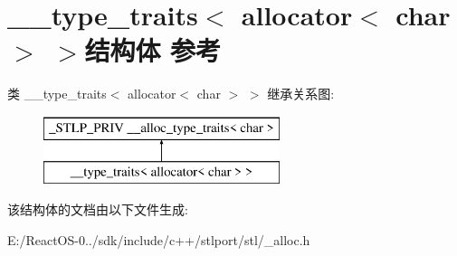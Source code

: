 \hypertarget{struct____type__traits_3_01allocator_3_01char_01_4_01_4}{}\section{\+\_\+\+\_\+type\+\_\+traits$<$ allocator$<$ char $>$ $>$结构体 参考}
\label{struct____type__traits_3_01allocator_3_01char_01_4_01_4}
类 \+\_\+\+\_\+type\+\_\+traits$<$ allocator$<$ char $>$ $>$ 继承关系图\+:\begin{figure}[H]
\begin{center}
\leavevmode
\includegraphics[height=2.000000cm]{struct____type__traits_3_01allocator_3_01char_01_4_01_4}
\end{center}
\end{figure}


该结构体的文档由以下文件生成\+:\begin{DoxyCompactItemize}
\item 
E\+:/\+React\+O\+S-\/0../sdk/include/c++/stlport/stl/\+\_\+alloc.\+h\end{DoxyCompactItemize}
